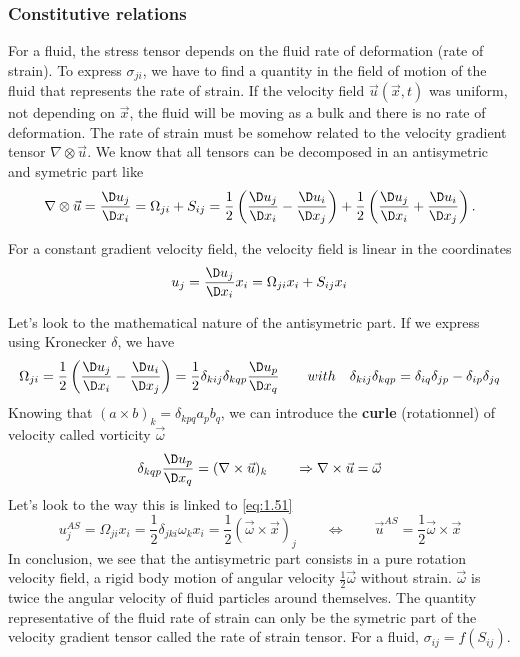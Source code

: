 	\subsubsection{Constitutive relations} 
		For a fluid, the stress tensor depends on the fluid rate of deformation (rate of strain). To express $\sigma _{ji}$, we have to find a quantity in the field of motion of the fluid that represents the rate of strain. If the velocity field $\vec{u}(\vec{x},t)$ was uniform, not depending on $\vec{x}$, the fluid will be moving as a bulk and there is no rate of deformation. The rate of strain must be somehow related to the velocity gradient tensor $\nabla \otimes \vec{u}$. We know that all tensors can be decomposed in an antisymetric and symetric part like 
		\begin{equation}
			\nabla \otimes \vec{u} = \frac{\D u_j}{\D x_i} = \Omega _{ji} + S _{ij} = \frac{1}{2} \left( \frac{\D u_j}{\D x_i} - \frac{\D u_i}{\D x_j} \right) + \frac{1}{2} \left( \frac{\D u_j}{\D x_i} + \frac{\D u_i}{\D x_j} \right).
		\end{equation}
		
		For a constant gradient velocity field, the velocity field is linear in the coordinates
		\begin{equation}
			u_j = \frac{\D u_j}{\D x_i}x_i = \Omega _{ji} x_i + S _{ij} x_i
			\label{eq:1.51}
		\end{equation}
		
		Let's look to the mathematical nature of the antisymetric part.  If we express using Kronecker $\delta$, we have
		\begin{equation}
			\Omega _{ji} =\frac{1}{2} \left( \frac{\D u_j}{\D x_i} - \frac{\D u_i}{\D x_j} \right) = \frac{1}{2} \delta _{kij}\delta _{kqp} \frac{\D u_p}{\D x_q} \qquad 
			with \quad \delta _{kij}\delta _{kqp} = \delta _{iq}\delta _{jp} - \delta _{ip}\delta _{jq} 
		\end{equation}
		Knowing that $(a \times b)_k = \delta _{kpq} a_p b_q$, we can introduce the \textbf{curle} (rotationnel) of velocity called vorticity $\vec{\omega}$
		\begin{equation}
			\delta _{kqp} \frac{\D u_p}{\D x_q} = (\nabla \times \vec{u})_k \qquad \Rightarrow \nabla \times \vec{u} = \vec{\omega}
		\end{equation}		 
		Let's look to the way this is linked to \eqref{eq:1.51}
		\begin{equation}
			 u_j^{AS} = \Omega _{ji}x_i = \frac{1}{2} \delta _{jki} \omega _k x_i = \frac{1}{2} (\vec{\omega} \times \vec{x})_j
			\qquad \Leftrightarrow \qquad 
			\vec{u}^{AS} = \frac{1}{2} \vec{\omega}\times \vec{x}
		\end{equation}
	 	In conclusion, we see that the antisymetric part consists in a pure rotation velocity field, a rigid body motion of angular velocity $\frac{1}{2}\vec{\omega}$ without strain. $\vec{\omega}$ is twice the angular velocity of fluid particles around themselves. The quantity representative of the fluid rate of strain can only be the symetric part of the velocity gradient tensor called the rate of strain tensor. For a fluid, $\sigma _{ij} = f(S_{ij})$. \\
	 	
